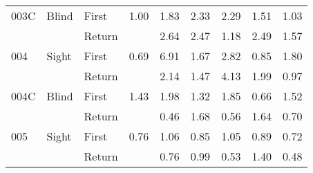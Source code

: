 \begin{table}[!htb]
\begin{tabular}{lllrrrrrr}
003C & Blind & First &     1.00 &   1.83 &   2.33 &                                                  2.29 &                                                   1.51 &    1.03 \\
    &       & Return &          &   2.64 &   2.47 &                                                  1.18 &                                                   2.49 &    1.57 \\
004 & Sight & First &     0.69 &   6.91 &   1.67 &                                                  2.82 &                                                   0.85 &    1.80 \\
    &       & Return &          &   2.14 &   1.47 &                                                  4.13 &                                                   1.99 &    0.97 \\
004C & Blind & First &     1.43 &   1.98 &   1.32 &                                                  1.85 &                                                   0.66 &    1.52 \\
    &       & Return &          &   0.46 &   1.68 &                                                  0.56 &                                                   1.64 &    0.70 \\
005 & Sight & First &     0.76 &   1.06 &   0.85 &                                                  1.05 &                                                   0.89 &    0.72 \\
    &       & Return &          &   0.76 &   0.99 &                                                  0.53 &                                                   1.40 &    0.48 \\
\bottomrule
\end{tabular}
\end{table}

